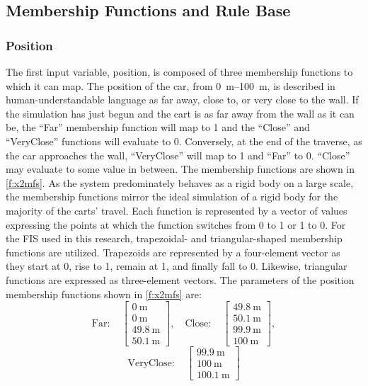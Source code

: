 \subsection{Membership Functions and Rule Base} \subsubsection{Position} The first input variable, position,
is composed of three membership functions to which it can map. The position of the car, from
\SIrange{0}{100}{\metre}, is described in human-understandable language as far away, close to, or very close
to the wall. If the simulation has just begun and the cart is as far away from the wall as it can be, the
``Far'' membership function will map to 1 and the ``Close'' and ``VeryClose'' functions will evaluate to 0.
Conversely, at the end of the traverse, as the car approaches the wall, ``VeryClose'' will map to 1 and
``Far'' to 0. ``Close'' may evaluate to some value in between. The membership functions are shown in
\cref{f:x2mfs}. As the system predominately behaves as a rigid body on a large scale, the membership
functions mirror the ideal simulation of a rigid body for the majority of the carts' travel. Each function is
represented by a vector of values expressing the points at which the function switches from 0 to 1 or 1 to 0.
For the FIS used in this research, trapezoidal- and triangular-shaped membership functions are utilized.
Trapezoids are represented by a four-element vector as they start at 0, rise to 1, remain at 1, and finally
fall to 0. Likewise, triangular functions are expressed as three-element vectors. The parameters of the
position membership functions shown in \cref{f:x2mfs} are: \begin{displaymath} \mathrm{Far:}\quad
\begin{bmatrix} \SI{0}{\metre}\\\SI{0}{\metre}\\\SI{49.8}{\metre}\\\SI{50.1}{\metre}
\end{bmatrix}, \quad \mathrm{Close:}\quad \begin{bmatrix}
    \SI{49.8}{\metre}\\\SI{50.1}{\metre}\\\SI{99.9}{\metre}\\\SI{100}{\metre} \end{bmatrix}, \end{displaymath}
\begin{displaymath} \mathrm{VeryClose:}\quad \begin{bmatrix}
\SI{99.9}{\metre}\\\SI{100}{\metre}\\\SI{100.1}{\metre} \end{bmatrix} \end{displaymath}


